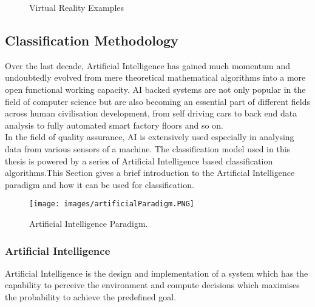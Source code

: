 \documentclass{article}
\begin{document}
\begin{figure}%
    \centering
    \qquad
    \caption{Virtual Reality Examples}%
    \label{fig:VrExample}%
\end{figure}










\subsection{Classification Methodology}

Over the last decade, Artificial Intelligence has gained much momentum and undoubtedly evolved from mere theoretical mathematical algorithms into a more open functional working capacity. AI backed systems are not only popular in the field of computer science but are also becoming an essential part of different fields across human civilisation development, from self driving cars to back end data analysis to fully automated smart factory floors and so on.\\

In the field of quality assurance, AI is extensively used especially in analysing data from various sensors of a machine. The classification model used in this thesis is powered by a series of Artificial Intelligence based classification algorithms.This Section gives a brief introduction to the Artificial Intelligence paradigm and how it can be used for classification. \\

\begin{figure}[htp]
    \centering
    \texttt{[image: images/artificialParadigm.PNG]}
    \caption{Artificial Intelligence Paradigm.}
    \label{fig: Artifical Paradigm}
\end{figure}



\subsubsection{Artificial Intelligence}Artificial Intelligence is the design and implementation of a system which has the capability to perceive the environment and compute decisions which maximises the probability to achieve the predefined goal.
\\
\end{document}
